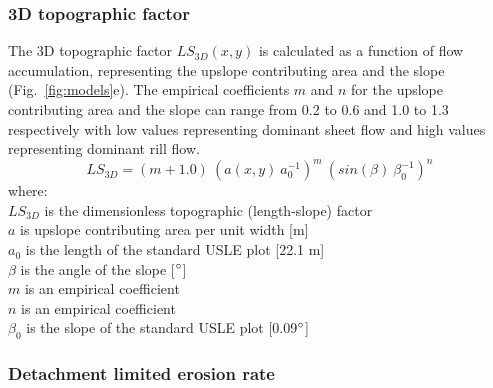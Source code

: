 \documentclass[gmd, manuscript]{copernicus}
\begin{document}

\subsubsection{3D topographic factor}
%
The 3D topographic factor $LS_{3D}(x,y)$
is calculated as a function of flow accumulation,
representing the upslope contributing area
and the slope 
(Fig.~\ref{fig:models}e). 
%
The empirical coefficients $m$ and $n$
for the upslope contributing area 
and the slope
can range from 0.2 to 0.6
and 1.0 to 1.3 respectively
with low values representing dominant sheet flow
and high values representing dominant rill flow.
%
\begin{equation}
\label{eq:ls_factor}
{LS_{3D} = (m+1.0) ~ (a(x,y) ~ a_0^{-1})^{m} ~ (sin(\beta) ~ \beta_0^{-1})^{n}}
\end{equation}
%
{\small
\noindent
where: \\
\noindent
\hspace*{0.5em} $LS_{3D}$ is the dimensionless topographic (length-slope) factor\\
\hspace*{0.5em} $a$ is upslope contributing area per unit width [\unit{m}]\\
\hspace*{0.5em} $a_0$ is the length of the standard USLE plot [22.1 \unit{m}]\\
\hspace*{0.5em} $\beta$ is the angle of the slope [$^{\circ}$]\\
\hspace*{0.5em} $m$ is an empirical coefficient\\
\hspace*{0.5em} $n$ is an empirical coefficient\\
\hspace*{0.5em} $\beta_0$ is the slope of the standard USLE plot [0.09$^{\circ}$]\\
}


\subsubsection{Detachment limited erosion rate}
\end{document}
